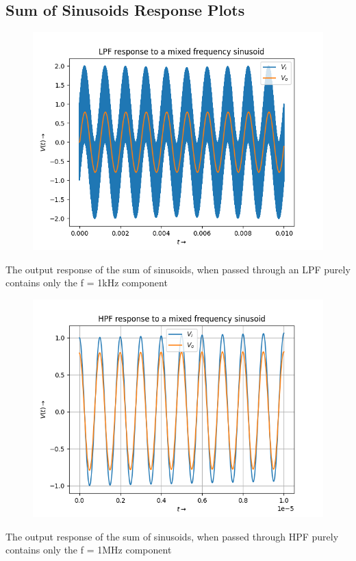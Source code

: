 \documentclass[12pt, a4paper]{article}
\begin{document}
\subsection{Sum of Sinusoids Response Plots}
\vspace*{-0.5cm}
\begin{figure}[H]
    \centering
    \includegraphics[scale = 0.8]{Figure_3.png}
    \label{fig:sample}
\end{figure}
\begin{center}
    The output response of the sum of sinusoids, when passed through an LPF purely contains only the f = 1kHz component 
\end{center}
\vspace*{-0.5cm}
\begin{figure}[H]
    \centering
    \includegraphics[scale = 0.8]{Figure_6.png}
    \label{fig:sample}
\end{figure}
\begin{center}
    The output response of the sum of sinusoids, when passed through HPF purely contains only the f = 1MHz component
\end{center}
\end{document}
